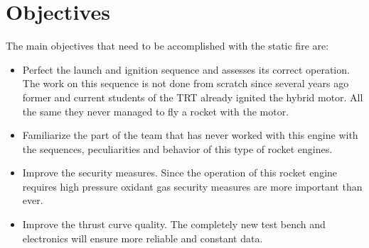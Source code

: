 
\section*{Objectives}

The main objectives that need to be accomplished with the static fire are:

\begin{itemize}
  \item Perfect the launch and ignition sequence and assesses its correct operation. The work on this sequence is not done from scratch since several years ago former and current students of the TRT already ignited the hybrid motor. All the same they never managed to fly a rocket with the motor.
  \item Familiarize the part of the team that has never worked with this engine with the sequences, peculiarities and behavior of this type of rocket engines.
  \item Improve the security measures. Since the operation of this rocket engine requires high pressure oxidant gas security measures are more important than ever.
  \item Improve the thrust curve quality. The completely new test bench and electronics will ensure more reliable and constant data. 
\end{itemize}

